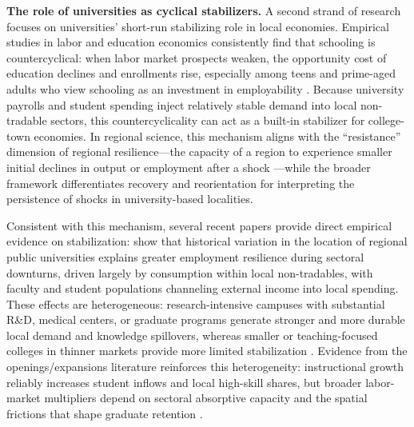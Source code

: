 \noindent \textbf{The role of universities as cyclical stabilizers.} A second strand of research focuses on universities’ short-run stabilizing role in local economies. Empirical studies in labor and education economics consistently find that schooling is countercyclical: when labor market prospects weaken, the opportunity cost of education declines and enrollments rise, especially among teens and prime-aged adults who view schooling as an investment in employability \citep{dellasBusinessCyclesSchooling2003,bettsSafePortStorm1995}. Because university payrolls and student spending inject relatively stable demand into local non-tradable sectors, this countercyclicality can act as a built-in stabilizer for college-town economies. In regional science, this mechanism aligns with the “resistance” dimension of regional resilience—the capacity of a region to experience smaller initial declines in output or employment after a shock \citep{martinNotionRegionalEconomic2015,martinRegionalEconomicResilience2012}—while the broader framework differentiates recovery and reorientation for interpreting the persistence of shocks in university-based localities. 

\noindent Consistent with this mechanism, several recent papers provide direct empirical evidence on stabilization: \citet{howardUniversitiesImproveLocal2024} show that historical variation in the location of regional public universities explains greater employment resilience during sectoral downturns, driven largely by consumption within local non-tradables, with faculty and student populations channeling external income into local spending. These effects are heterogeneous: research-intensive campuses with substantial R\&D, medical centers, or graduate programs generate stronger and more durable local demand and knowledge spillovers, whereas smaller or teaching-focused colleges in thinner markets provide more limited stabilization \citep{howardUniversitiesImproveLocal2024,beesonEffectsCollegesUniversities}. Evidence from the openings/expansions literature reinforces this heterogeneity: instructional growth reliably increases student inflows and local high-skill shares, but broader labor-market multipliers depend on sectoral absorptive capacity and the spatial frictions that shape graduate retention \citep{berlingieriCollegeOpeningsLocal2022,ferhatImpactUniversityOpenings,amendolaDoesGraduateHuman2020}.



